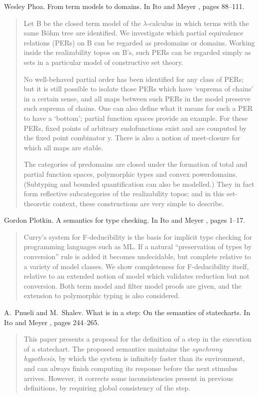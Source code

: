 \begin{thebibliography}{10}
Wesley Phoa.
\newblock From term models to domains.
\newblock In Ito and Meyer \cite{TACS91}, pages 88--111.
\begin{quotation}
Let {\sf B} be the closed term model of the $\lambda$-calculus in which terms
  with the same B\"ohm tree are identified. We investigate which partial
  equivalence relations (PERs) on {\sf B} can be regarded as predomains or
  domains. Working inside the realizability topos on {\sf B}'s, such PERs can
  be regarded simply as sets in a particular model of constructive set theory.
  \par No well-behaved partial order has been identified for any class of PERs;
  but it is still possible to isolate those PERs which have `suprema of chains'
  in a certain sense, and all maps between such PERs in the model preserve such
  suprema of chains. One can also define what it means for such a PER to have a
  `bottom'; partial function spaces provide an example. For these PERs, fixed
  points of arbitrary endofunctions exist and are computed by the fixed point
  combinator {\sf y}. There is also a notion of meet-closure for which all maps
  are stable. \par The categories of predomains are closed under the formation
  of total and partial function spaces, polymorphic types and convex
  powerdomains. (Subtyping and bounded quantification can also be modelled.)
  They in fact form reflective subcategories of the realizability topos; and in
  this set-theoretic context, these constructions are very simple to describe.
\end{quotation}

Gordon Plotkin.
\newblock A semantics for type checking.
\newblock In Ito and Meyer \cite{TACS91}, pages 1--17.
\begin{quotation}
Curry's system for F-deducibility is the basis for implicit type checking for
  programming languages such as ML\null. If a natural ``preservation of types
  by conversion'' rule is added it becomes undecidable, but complete relative
  to a variety of model classes. We show completeness for F-deducibility
  itself, relative to an extended notion of model which validates reduction but
  not conversion. Both term model and filter model proofs are given, and the
  extension to polymorphic typing is also considered.
\end{quotation}

A.~Pnueli and M.~Shalev.
\newblock What is in a step: On the semantics of statecharts.
\newblock In Ito and Meyer \cite{TACS91}, pages 244--265.
\begin{quotation}
This paper presents a proposal for the definition of a step in the execution of
  a statechart. The proposed semantics maintains the {\em synchrony
  hypothesis\/}, by which the system is infinitely faster than its environment,
  and can always finish computing its response before the next stimulus
  arrives. However, it corrects some inconsistencies present in previous
  definitions, by requiring global consistency of the step.
\end{quotation}


\end{thebibliography}
